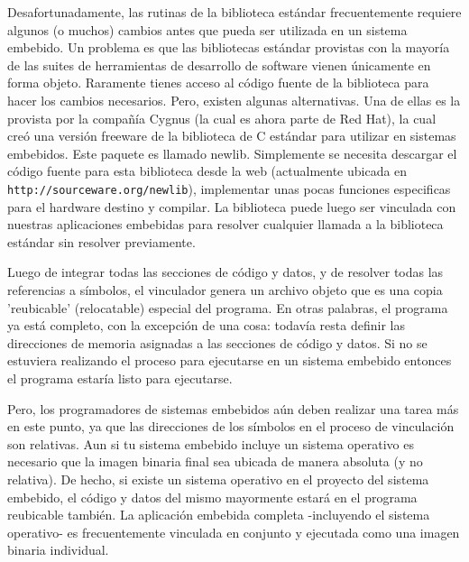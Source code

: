 \documentclass[12pt]{article}
\begin{document}


Desafortunadamente, las rutinas de la biblioteca estándar frecuentemente requiere 
algunos (o muchos) cambios antes que pueda ser utilizada en un sistema embebido.
Un problema es que las bibliotecas estándar provistas con la mayoría de las 
suites de herramientas de desarrollo de software vienen únicamente en forma objeto.
Raramente tienes acceso al código fuente de la biblioteca para hacer los 
cambios necesarios. Pero, existen algunas alternativas. Una de ellas es
la provista por la compañía Cygnus (la cual es ahora parte de Red Hat),
la cual creó una versión freeware de la biblioteca de C estándar para utilizar 
en sistemas embebidos.
Este paquete es llamado newlib. Simplemente se necesita descargar el código fuente
para esta biblioteca desde la web (actualmente ubicada en {\tt http://sourceware.org/newlib}),
implementar unas pocas funciones especificas para el hardware destino y compilar.
La biblioteca puede luego ser vinculada con nuestras aplicaciones embebidas
para resolver cualquier llamada a la biblioteca estándar sin resolver previamente.

Luego de integrar todas las secciones de código y datos, y de resolver todas
las referencias a símbolos, el vinculador genera un archivo objeto que es
una copia 'reubicable' (relocatable) especial del programa. En otras palabras,
el programa ya está completo, con la excepción de una cosa: todavía
resta definir las direcciones de memoria asignadas a las secciones de código y 
datos. Si no se estuviera realizando el proceso para ejecutarse en un 
sistema embebido entonces el programa estaría listo para ejecutarse.

Pero, los programadores de sistemas embebidos aún deben realizar una
tarea más en este punto, ya que 
las direcciones de los símbolos en el proceso de vinculación son relativas.
Aun si tu sistema embebido incluye un sistema operativo es necesario
que la imagen binaria final sea ubicada de manera absoluta (y no relativa).
De hecho, si existe un sistema operativo en el proyecto del sistema embebido,
el código y datos del mismo mayormente estará en el programa reubicable 
también.
La aplicación embebida completa -incluyendo el sistema operativo- es
frecuentemente vinculada en conjunto y ejecutada como una imagen binaria
individual.
\end{document}
